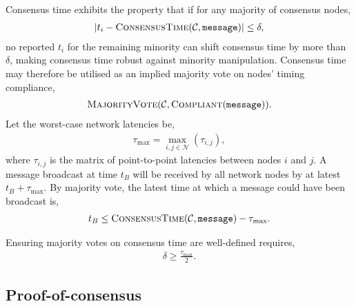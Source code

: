 \documentclass[twocolumn, aps, amsmath, amssymb, nofootinbib, superscriptaddress, longbibliography, floatfix, eqsecnum, rmp]{revtex4-2}
\begin{document}
Consensus time exhibits the property that if for any majority of consensus nodes,
\begin{align}
	|t_i - \textsc{ConsensusTime}(\mathcal{C},\texttt{message})|	\leq \delta,
\end{align}
no reported $t_i$ for the remaining minority can shift consensus time by more than $\delta$, making consensus time robust against minority manipulation. Consensus time may therefore be utilised as an implied majority vote on nodes' timing compliance,
\begin{align}
	\textsc{MajorityVote}(\mathcal{C}, \textsc{Compliant}(\texttt{message})).
\end{align}
Let the worst-case network latencies be,
\begin{align}
	\tau_\mathrm{max} = \max_{i,j\in\mathcal{N}}(\tau_{i,j}),
\end{align}
where $\tau_{i,j}$ is the matrix of point-to-point latencies between nodes $i$ and $j$. A message broadcast at time $t_B$ will be received by all network nodes by at latest $t_B+\tau_\mathrm{max}$.
By majority vote, the latest time at which a message could have been broadcast is,
\begin{align}
	t_B \leq \textsc{ConsensusTime}(\mathcal{C},\texttt{message}) - \tau_\mathrm{max}.
\end{align}

Ensuring majority votes on consensus time are well-defined requires,
\begin{align}
	\delta \geq \frac{\tau_\mathrm{max}}{2}.
\end{align}


%
%

\subsection{Proof-of-consensus} \label{sec:PoC}
\end{document}
